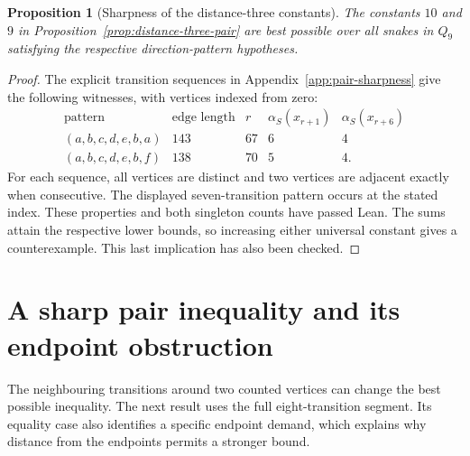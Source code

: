\documentclass[11pt,a4paper]{article}
\newtheorem{proposition}[theorem]{Proposition}
\theoremstyle{definition}
\theoremstyle{remark}
\newcommand{\Q}{Q}
\begin{document}
\begin{proposition}[Sharpness of the distance-three constants]\label{prop:pair-sharpness}
The constants $10$ and $9$ in Proposition~\ref{prop:distance-three-pair} are best possible over all snakes in $\Q_9$ satisfying the respective direction-pattern hypotheses.
\end{proposition}
\begin{proof}
The explicit transition sequences in Appendix~\ref{app:pair-sharpness} give the following witnesses, with vertices indexed from zero:
\[
\begin{array}{c|c|c|c|c}
\text{pattern}&\text{edge length}&r&\alpha_S(x_{r+1})&\alpha_S(x_{r+6})\\\hline
(a,b,c,d,e,b,a)&143&67&6&4\\
(a,b,c,d,e,b,f)&138&70&5&4.
\end{array}
\]
For each sequence, all vertices are distinct and two vertices are adjacent exactly when consecutive. The displayed seven-transition pattern occurs at the stated index. These properties and both singleton counts have passed Lean. The sums attain the respective lower bounds, so increasing either universal constant gives a counterexample. This last implication has also been checked.
\end{proof}


\section{A sharp pair inequality and its endpoint obstruction}\label{sec:endpoint-pair}
The neighbouring transitions around two counted vertices can change the best possible inequality. The next result uses the full eight-transition segment. Its equality case also identifies a specific endpoint demand, which explains why distance from the endpoints permits a stronger bound.
\end{document}
